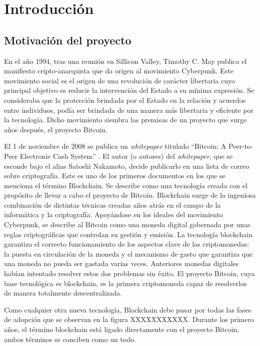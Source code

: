 \chapter{Introducción}
\section{Motivación del proyecto}

En el año 1994, tras una reunión en Sillicon Valley, Timothy C. May publica el manifiesto cripto-anarquista \cite{criptoanarquista} que da origen al movimiento Cyberpunk. Este movimiento social es el origen de una revolución de carácter libertaria cuyo principal objetivo es reducir la intervención del Estado a su mínima expresión. Se consideraba que la protección brindada por el Estado en la relación y acuerdos entre individuos, podía ser brindada de una manera más libertaria y eficiente por la tecnología. Dicho movimiento siembra las premisas de un proyecto que surge años después, el proyecto Bitcoin. \newline

El 1 de noviembre de 2008 se publica un \textit{whitepaper} titulado “Bitcoin: A Peer-to-Peer Electronic Cash System” \cite{bitcoin}. El autor (o autores) del \textit{whitepaper}, que se esconde bajo el alias Satoshi Nakamoto, decide publicarlo en una lista de correo sobre criptografía. Este es uno de los primeros documentos en los que se menciona el término Blockchain. Se describe como una tecnología creada con el propósito de llevar a cabo el proyecto de Bitcoin. Blockchain surge de la ingeniosa combinación de distintas técnicas creadas años atrás en el campo de la informática y la criptografía. Apoyándose en los ideales del movimiento Cyberpunk, se describe al Bitcoin como una moneda digital gobernada por unas reglas criptográficas que controlan su gestión y emisión. La tecnología blockchain garantiza el correcto funcionamiento de los aspectos clave de las criptomonedas: la puesta en circulación de la moneda y el mecanismo de gasto que garantiza que una moneda no pueda ser gastada varias veces. Anteriores monedas digitales habían intentado resolver estos dos problemas sin éxito. El proyecto Bitcoin, cuya base tecnológica es blockchain, es la primera criptomoneda capaz de resolverlos de manera totalmente descentralizada. \newline

Como cualquier otra nueva tecnología, Blockchain debe pasar por todas las fases de adopción que se observan en la figura XXXXXXXXXXX. Durante los primero años, el término blockchain está ligado directamente con el proyecto Bitcoin, ambos términos se conciben como un todo. \newline

